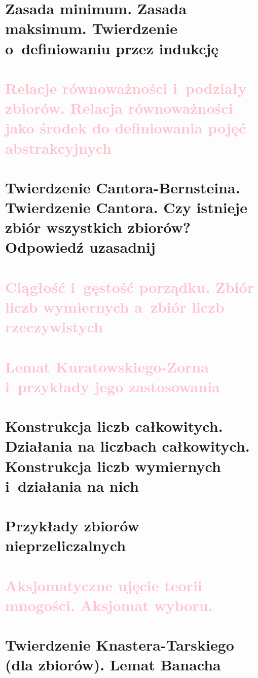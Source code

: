 \section{Zasada minimum. Zasada maksimum. Twierdzenie o~definiowaniu przez indukcję}


\section{\textcolor{pink}{Relacje równoważności i~podziały zbiorów. Relacja równoważności jako środek do definiowania pojęć abstrakcyjnych}}

\section{Twierdzenie Cantora-Bernsteina. Twierdzenie Cantora. Czy istnieje zbiór wszystkich zbiorów? Odpowiedź uzasadnij}
\label{mfi:cantor}


\section{\textcolor{pink}{Ciągłość i~gęstość porządku. Zbiór liczb wymiernych a~zbiór liczb rzeczywistych}}

\section{\textcolor{pink}{Lemat Kuratowskiego-Zorna i~przykłady jego zastosowania}}

\section{Konstrukcja liczb całkowitych. Działania na liczbach całkowitych. Konstrukcja liczb wymiernych i~działania na nich}


\section{Przykłady zbiorów nieprzeliczalnych}


\section{\textcolor{pink}{Aksjomatyczne ujęcie teorii mnogości. Aksjomat wyboru.}}

\section{Twierdzenie Knastera-Tarskiego (dla zbiorów). Lemat Banacha}
\label{mfi:knaster_tarski_and_banach}


